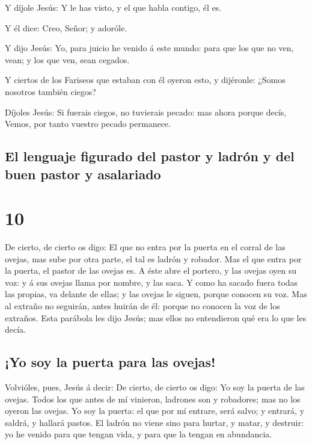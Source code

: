  Y díjole Jesús: Y le has visto, y el que habla contigo, él
es.

 Y él dice: Creo, Señor; y adoróle.

 Y dijo Jesús: Yo, para juicio he venido á este mundo: para
que los que no ven, vean; y los que ven, sean cegados.

 Y ciertos de los Fariseos que estaban con él oyeron esto,
y dijéronle: ¿Somos nosotros también ciegos?

 Díjoles Jesús: Si fuerais ciegos, no tuvierais pecado: mas
ahora porque decís, Vemos, por tanto vuestro pecado permanece.

\hypertarget{el-lenguaje-figurado-del-pastor-y-ladruxf3n-y-del-buen-pastor-y-asalariado}{%
\subsection{El lenguaje figurado del pastor y ladrón y del buen pastor y
asalariado}\label{el-lenguaje-figurado-del-pastor-y-ladruxf3n-y-del-buen-pastor-y-asalariado}}

\hypertarget{section-9}{%
\section{10}\label{section-9}}

 De cierto, de cierto os digo: El que no entra por la puerta
en el corral de las ovejas, mas sube por otra parte, el tal es ladrón y
robador.  Mas el que entra por la puerta, el pastor de las
ovejas es.  A éste abre el portero, y las ovejas oyen su
voz: y á sus ovejas llama por nombre, y las saca.  Y como ha
sacado fuera todas las propias, va delante de ellas; y las ovejas le
siguen, porque conocen su voz.  Mas al extraño no seguirán,
antes huirán de él: porque no conocen la voz de los extraños.
 Esta parábola les dijo Jesús; mas ellos no entendieron qué
era lo que les decía.

\hypertarget{yo-soy-la-puerta-para-las-ovejas}{%
\subsection{¡Yo soy la puerta para las
ovejas!}\label{yo-soy-la-puerta-para-las-ovejas}}

 Volvióles, pues, Jesús á decir: De cierto, de cierto os
digo: Yo soy la puerta de las ovejas.  Todos los que antes
de mí vinieron, ladrones son y robadores; mas no los oyeron las ovejas.
 Yo soy la puerta: el que por mí entrare, será salvo; y
entrará, y saldrá, y hallará pastos.  El ladrón no viene
sino para hurtar, y matar, y destruir: yo he venido para que tengan
vida, y para que la tengan en abundancia.

